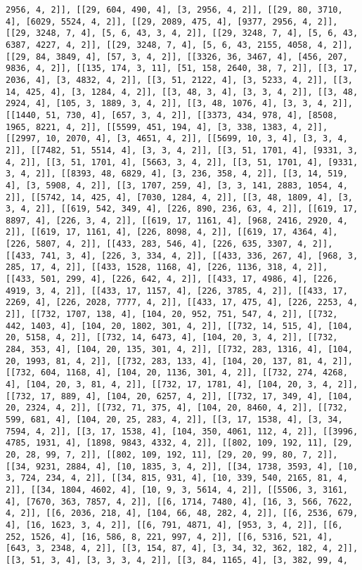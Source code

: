 \documentclass[12pt,fleqn]{article}\usepackage{../../common}
\begin{document}
\begin{verbatim}
2956, 4, 2]], [[29, 604, 490, 4], [3, 2956, 4, 2]], [[29, 80, 3710, 4], [6029, 5524, 4, 2]], [[29, 2089, 475, 4], [9377, 2956, 4, 2]], [[29, 3248, 7, 4], [5, 6, 43, 3, 4, 2]], [[29, 3248, 7, 4], [5, 6, 43, 6387, 4227, 4, 2]], [[29, 3248, 7, 4], [5, 6, 43, 2155, 4058, 4, 2]], [[29, 84, 3849, 4], [57, 3, 4, 2]], [[3326, 36, 3467, 4], [456, 207, 9836, 4, 2]], [[135, 174, 3, 11], [51, 158, 2640, 38, 7, 2]], [[3, 17, 2036, 4], [3, 4832, 4, 2]], [[3, 51, 2122, 4], [3, 5233, 4, 2]], [[3, 14, 425, 4], [3, 1284, 4, 2]], [[3, 48, 3, 4], [3, 3, 4, 2]], [[3, 48, 2924, 4], [105, 3, 1889, 3, 4, 2]], [[3, 48, 1076, 4], [3, 3, 4, 2]], [[1440, 51, 730, 4], [657, 3, 4, 2]], [[3373, 434, 978, 4], [8508, 1965, 8221, 4, 2]], [[5599, 451, 194, 4], [3, 338, 1383, 4, 2]], [[2997, 10, 2070, 4], [3, 4651, 4, 2]], [[5699, 10, 3, 4], [3, 3, 4, 2]], [[7482, 51, 5514, 4], [3, 3, 4, 2]], [[3, 51, 1701, 4], [9331, 3, 4, 2]], [[3, 51, 1701, 4], [5663, 3, 4, 2]], [[3, 51, 1701, 4], [9331, 3, 4, 2]], [[8393, 48, 6829, 4], [3, 236, 358, 4, 2]], [[3, 14, 519, 4], [3, 5908, 4, 2]], [[3, 1707, 259, 4], [3, 3, 141, 2883, 1054, 4, 2]], [[5742, 14, 425, 4], [7030, 1284, 4, 2]], [[3, 48, 1809, 4], [3, 3, 4, 2]], [[619, 542, 349, 4], [226, 890, 236, 63, 4, 2]], [[619, 17, 8897, 4], [226, 3, 4, 2]], [[619, 17, 1161, 4], [968, 2416, 2920, 4, 2]], [[619, 17, 1161, 4], [226, 8098, 4, 2]], [[619, 17, 4364, 4], [226, 5807, 4, 2]], [[433, 283, 546, 4], [226, 635, 3307, 4, 2]], [[433, 741, 3, 4], [226, 3, 334, 4, 2]], [[433, 336, 267, 4], [968, 3, 285, 17, 4, 2]], [[433, 1528, 1168, 4], [226, 1136, 318, 4, 2]], [[433, 501, 299, 4], [226, 642, 4, 2]], [[433, 17, 4986, 4], [226, 4919, 3, 4, 2]], [[433, 17, 1157, 4], [226, 3785, 4, 2]], [[433, 17, 2269, 4], [226, 2028, 7777, 4, 2]], [[433, 17, 475, 4], [226, 2253, 4, 2]], [[732, 1707, 138, 4], [104, 20, 952, 751, 547, 4, 2]], [[732, 442, 1403, 4], [104, 20, 1802, 301, 4, 2]], [[732, 14, 515, 4], [104, 20, 5158, 4, 2]], [[732, 14, 6473, 4], [104, 20, 3, 4, 2]], [[732, 284, 353, 4], [104, 20, 135, 301, 4, 2]], [[732, 283, 1316, 4], [104, 20, 1993, 81, 4, 2]], [[732, 283, 133, 4], [104, 20, 137, 81, 4, 2]], [[732, 604, 1168, 4], [104, 20, 1136, 301, 4, 2]], [[732, 274, 4268, 4], [104, 20, 3, 81, 4, 2]], [[732, 17, 1781, 4], [104, 20, 3, 4, 2]], [[732, 17, 889, 4], [104, 20, 6257, 4, 2]], [[732, 17, 349, 4], [104, 20, 2324, 4, 2]], [[732, 71, 375, 4], [104, 20, 8460, 4, 2]], [[732, 599, 681, 4], [104, 20, 25, 283, 4, 2]], [[3, 17, 1538, 4], [3, 34, 7594, 4, 2]], [[3, 17, 1538, 4], [104, 350, 4061, 112, 4, 2]], [[3996, 4785, 1931, 4], [1898, 9843, 4332, 4, 2]], [[802, 109, 192, 11], [29, 20, 28, 99, 7, 2]], [[802, 109, 192, 11], [29, 20, 99, 80, 7, 2]], [[34, 9231, 2884, 4], [10, 1835, 3, 4, 2]], [[34, 1738, 3593, 4], [10, 3, 724, 234, 4, 2]], [[34, 815, 931, 4], [10, 339, 540, 2165, 81, 4, 2]], [[34, 1804, 4602, 4], [10, 9, 3, 5614, 4, 2]], [[5506, 3, 3161, 4], [7670, 363, 7857, 4, 2]], [[6, 1714, 7480, 4], [16, 3, 566, 7622, 4, 2]], [[6, 2036, 218, 4], [104, 66, 48, 282, 4, 2]], [[6, 2536, 679, 4], [16, 1623, 3, 4, 2]], [[6, 791, 4871, 4], [953, 3, 4, 2]], [[6, 252, 1526, 4], [16, 586, 8, 221, 997, 4, 2]], [[6, 5316, 521, 4], [643, 3, 2348, 4, 2]], [[3, 154, 87, 4], [3, 34, 32, 362, 182, 4, 2]], [[3, 51, 3, 4], [3, 3, 3, 4, 2]], [[3, 84, 1165, 4], [3, 382, 99, 4, 
\end{verbatim}
\end{document}
